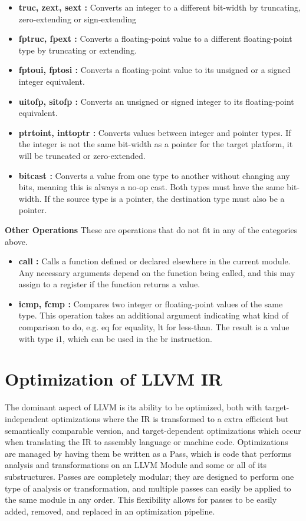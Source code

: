\documentclass{book}
\begin{document}
	\begin{itemize}
		\item \textbf{truc, zext, sext : }Converts an integer to a different bit-width by truncating, zero-extending or sign-extending
		\item \textbf{fptruc, fpext : } Converts a floating-point value to a different floating-point type by truncating or extending.
		\item \textbf{fptoui, fptosi : }Converts a floating-point value to its unsigned or a signed integer	equivalent.
		\item \textbf{uitofp, sitofp : } Converts  an  unsigned  or  signed  integer  to  its  floating-point equivalent.
		\item \textbf{ptrtoint, inttoptr : }Converts  values  between  integer  and  pointer  types. If the integer is not the same bit-width as a pointer for the target platform, it will be
		truncated or zero-extended.
		\item \textbf{bitcast : }Converts a value from one type to another without changing any bits,
		meaning this is always a no-op cast. Both types must have the same bit-width. If the source type is a pointer, the destination type must also be a pointer.
	\end{itemize}

	\textbf{Other Operations} \newline \newline
	These are operations that do not fit in any of the categories above.
	
	\begin{itemize}
		\item \textbf{call : }Calls a function defined or declared elsewhere in the current module.  Any necessary arguments depend on the function being called, and this may assign to a register if the function returns a value.
		\item \textbf{icmp, fcmp : }Compares two integer or floating-point values of the same type. This operation takes an additional argument indicating what kind of comparison to do, e.g. eq for equality, lt for less-than. The result is a value with type i1, which can be used in the br instruction.
	\end{itemize}

	\section{Optimization of LLVM IR}
	 The dominant aspect of LLVM is its ability to be optimized, both with target-independent optimizations  where  the  IR  is  transformed  to  a  extra  efficient  but  semantically  comparable version, and target-dependent optimizations which occur when translating the IR to assembly language or machine code. Optimizations are managed by having them be written as a Pass, which is code that performs analysis and transformations on an LLVM Module and some or all of its substructures.  Passes are completely modular; they are designed to perform one type of analysis or transformation, and multiple passes can easily be applied to the same module in any order.  This flexibility allows for passes to be easily added, removed, and replaced in an optimization pipeline.\newline
	 
\end{document}
